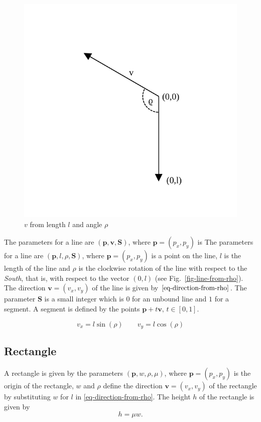 \documentclass[11pt]{article}
\newcommand{\pb}{\mathbf{p}}
\newcommand{\Sb}{\mathbf{S}}
\newcommand{\vb}{\mathbf{v}}
\newcommand{\figref}[1]{Fig.~\eqref{#1}}
\begin{document}
\begin{figure}
    \centering
    \includegraphics[trim=0 20 0 80]{odg/line-from-angle.pdf}
    \caption{$v$ from length $l$ and angle $\rho$}\label{fig-line-from-rho}
\end{figure}
The parameters for a line are $(\pb, \vb, \Sb)$, where $\pb=(p_{x}, p_{y})$ is
The parameters for a line are $(\pb, l, \rho, \Sb)$, where $\pb=(p_{x}, 
p_{y})$ is a point on the line, $l$ is the length of the line and $\rho$ is the clockwise rotation
of the line with respect to the \textsl{South}, that is, with respect to the
vector $(0, l)$ (see \figref{fig-line-from-rho}). The direction $\vb=(v_{x},
v_{y})$ of the line is given by $\eqref{eq-direction-from-rho}$. The
parameter $\Sb$ is a small integer which is $0$ for an unbound line and $1$
for a segment. A segment is defined by the points $\pb+t\vb,\,t\in[0,1]$.

\begin{equation}
    v_{x} = l\sin(\rho)\qquad v_{y} = l\cos(\rho) \label{eq-direction-from-rho}
\end{equation}
\subsection{Rectangle}
\label{sec-representation-rectangle}

A rectangle is given by the parameters $(\pb, w, \rho, \mu)$, where
$\pb=(p_{x}, p_{y})$ is the origin of the rectangle, $w$ and $\rho$ define the
direction $\vb=(v_{x}, v_{y})$ of the rectangle by substituting $w$ for $l$ in
\eqref{eq-direction-from-rho}. 
The height $h$ of the rectangle is given by
\begin{equation}
    h = \mu w.\label{eq-height-rectangle}
\end{equation}
\end{document}
